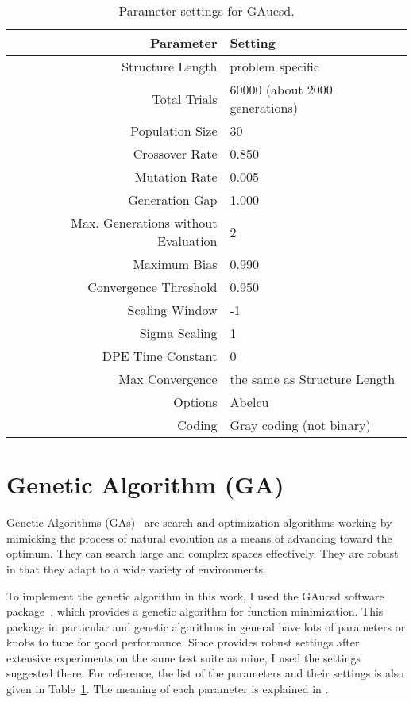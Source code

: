 \documentclass{article}
\begin{document}
\begin{table}[ht]
\centering
\begin{tabular}{r|l}
\hline
{\bf Parameter} & {\bf Setting}\\
\hline\hline
Structure Length & problem specific\\
\hline
Total Trials & 60000 (about 2000 generations)\\
\hline
Population Size & 30\\
\hline
Crossover Rate & 0.850\\
\hline
Mutation Rate & 0.005\\
\hline
Generation Gap & 1.000\\
\hline
Max. Generations without Evaluation & 2\\
\hline
Maximum Bias & 0.990\\
\hline
Convergence Threshold & 0.950\\
\hline
Scaling Window & -1\\
\hline
Sigma Scaling & 1\\
\hline
DPE Time Constant & 0\\
\hline
Max Convergence & the same as Structure Length\\
\hline
Options & Abelcu\\
\hline
Coding & Gray coding (not binary)\\
\end{tabular}
\caption{Parameter settings for GAucsd.}
\label{tab:ga-algo}
\end{table}

\section{Genetic Algorithm (GA)}
\label{sec:gen-algo}

Genetic Algorithms (GAs)~\cite{Go89} are search and optimization
algorithms working by mimicking the process of natural evolution as a
means of advancing toward the optimum. They can search large and
complex spaces effectively. They are robust in that they adapt to a
wide variety of environments. 

To implement the genetic algorithm in this work, I used the GAucsd
software package~\cite{ScGr92}, which provides a genetic algorithm for
function minimization. This package in particular and genetic
algorithms in general have lots of parameters or knobs to tune for
good performance. Since \cite{ScCaEs89} provides robust settings after
extensive experiments on the same test suite as mine, I used the
settings suggested there. For reference, the list of the parameters
and their settings is also given in Table~\ref{tab:ga-algo}. The
meaning of each parameter is explained in \cite{ScGr92}.
\end{document}
